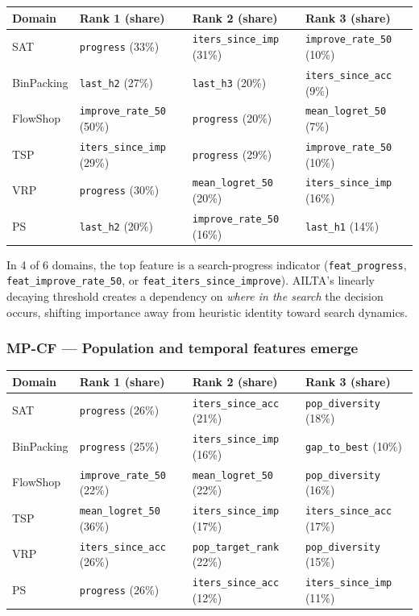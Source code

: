 \documentclass[11pt,a4paper]{article}
\begin{document}
\begin{table}[H]
\centering
\small
\begin{tabular}{llll}
\toprule
Domain & Rank 1 (share) & Rank 2 (share) & Rank 3 (share) \\
\midrule
SAT & \texttt{progress} (33\%) & \texttt{iters\_since\_imp} (31\%) & \texttt{improve\_rate\_50} (10\%) \\
BinPacking & \texttt{last\_h2} (27\%) & \texttt{last\_h3} (20\%) & \texttt{iters\_since\_acc} (9\%) \\
FlowShop & \texttt{improve\_rate\_50} (50\%) & \texttt{progress} (20\%) & \texttt{mean\_logret\_50} (7\%) \\
TSP & \texttt{iters\_since\_imp} (29\%) & \texttt{progress} (29\%) & \texttt{improve\_rate\_50} (10\%) \\
VRP & \texttt{progress} (30\%) & \texttt{mean\_logret\_50} (20\%) & \texttt{iters\_since\_imp} (16\%) \\
PS & \texttt{last\_h2} (20\%) & \texttt{improve\_rate\_50} (16\%) & \texttt{last\_h1} (14\%) \\
\bottomrule
\end{tabular}
\end{table}

In 4 of 6 domains, the top feature is a search-progress indicator
(\texttt{feat\_progress}, \texttt{feat\_improve\_\allowbreak{}rate\_50},
or \texttt{feat\_iters\_since\_\allowbreak{}improve}).
AILTA's linearly decaying threshold creates a dependency on
\emph{where in the search} the decision occurs, shifting importance away
from heuristic identity toward search dynamics.

\subsubsection*{MP-CF --- Population and temporal features emerge}

\begin{table}[H]
\centering
\small
\begin{tabular}{llll}
\toprule
Domain & Rank 1 (share) & Rank 2 (share) & Rank 3 (share) \\
\midrule
SAT & \texttt{progress} (26\%) & \texttt{iters\_since\_acc} (21\%) & \texttt{pop\_diversity} (18\%) \\
BinPacking & \texttt{progress} (25\%) & \texttt{iters\_since\_imp} (16\%) & \texttt{gap\_to\_best} (10\%) \\
FlowShop & \texttt{improve\_rate\_50} (22\%) & \texttt{mean\_logret\_50} (22\%) & \texttt{pop\_diversity} (16\%) \\
TSP & \texttt{mean\_logret\_50} (36\%) & \texttt{iters\_since\_imp} (17\%) & \texttt{iters\_since\_acc} (17\%) \\
VRP & \texttt{iters\_since\_acc} (26\%) & \texttt{pop\_target\_rank} (22\%) & \texttt{pop\_diversity} (15\%) \\
PS & \texttt{progress} (26\%) & \texttt{iters\_since\_acc} (12\%) & \texttt{iters\_since\_imp} (11\%) \\
\bottomrule
\end{tabular}
\end{table}
\end{document}
